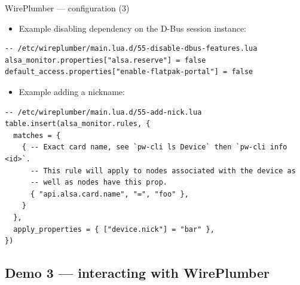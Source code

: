 \begin{frame}[fragile]{WirePlumber — configuration (3)}
  \begin{itemize}
  \item Example disabling dependency on the D-Bus session instance:
  \end{itemize}

    \begin{block}{}
      \fontsize{9}{9}\selectfont
        \begin{verbatim}
-- /etc/wireplumber/main.lua.d/55-disable-dbus-features.lua
alsa_monitor.properties["alsa.reserve"] = false
default_access.properties["enable-flatpak-portal"] = false
          \end{verbatim}
        \end{block}

  \begin{itemize}
  \item Example adding a nickname:
  \end{itemize}

    \begin{block}{}
      \fontsize{9}{9}\selectfont
        \begin{verbatim}
-- /etc/wireplumber/main.lua.d/55-add-nick.lua
table.insert(alsa_monitor.rules, {
  matches = {
    { -- Exact card name, see `pw-cli ls Device` then `pw-cli info <id>`.
      -- This rule will apply to nodes associated with the device as
      -- well as nodes have this prop.
      { "api.alsa.card.name", "=", "foo" },
    }
  },
  apply_properties = { ["device.nick"] = "bar" },
})
        \end{verbatim}
      \end{block}

\end{frame}




\subsection{Demo 3 — interacting with WirePlumber}



